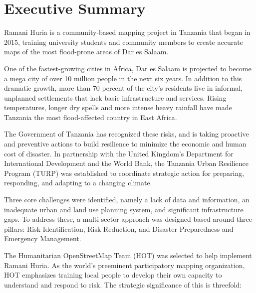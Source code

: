 \documentclass[a4paper,12pt,twoside]{article}
\begin{document}
\section{Executive Summary}
\label{executivesummary}
\begin{multicols}{2}

Ramani Huria is a community-based mapping project in Tanzania that began in 2015, training university students and community members to create accurate maps of the most flood-prone areas of Dar es Salaam. 

One of the fastest-growing cities in Africa, Dar es Salaam is projected to become a mega city of over 10 million people in the next six years. In addition to this dramatic growth, more than 70 percent of the city's residents live in informal, unplanned settlements that lack basic infrastructure and services. Rising temperatures, longer dry spells and more intense heavy rainfall have made Tanzania the most flood-affected country in East Africa.

The Government of Tanzania has recognized these risks, and is taking proactive and preventive actions to build resilience to minimize the economic and human cost of disaster. In partnership with the United Kingdom's Department for International Development and the World Bank, the Tanzania Urban Resilience Program (TURP) was established to coordinate strategic action for preparing, responding, and adapting to a changing climate.

Three core challenges were identified, namely a lack of data and information, an inadequate urban and land use planning system, and significant infrastructure gaps. To address these, a multi-sector approach was designed based around three pillars: Risk Identification, Risk Reduction, and Disaster Preparedness and Emergency Management. 

The Humanitarian OpenStreetMap Team (HOT) was selected  to help implement  Ramani Huria. As the world's preeminent participatory mapping organization, HOT emphasizes training local people  to develop their own capacity to understand and respond to risk. The strategic significance of this is threefold: 

\end{multicols}
\end{document}
